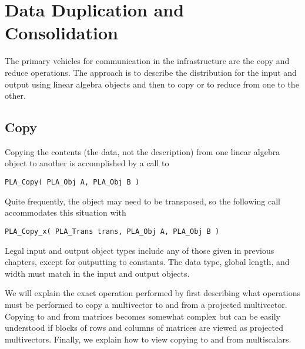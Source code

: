 \chapter{Data Duplication and Consolidation}
\label{chapter:data}

The primary vehicles for communication in the \plapack infrastructure are the
copy and reduce operations.  The approach is to describe the distribution for 
the input and output using linear algebra objects and then to copy or to reduce
from one to the other.


\section{Copy}

Copying the contents (the data, not the description) from one
linear algebra object to another is accomplished by a call to
\begin{FlaSpec}
\begin{verbatim}
PLA_Copy( PLA_Obj A, PLA_Obj B )
\end{verbatim}
\end{FlaSpec}

Quite frequently, the object may need to be transposed, so
the following call accommodates this situation with
\begin{FlaSpec}
\begin{verbatim}
PLA_Copy_x( PLA_Trans trans, PLA_Obj A, PLA_Obj B )
\end{verbatim}
\end{FlaSpec}
Legal input and output object types include any of those given 
in previous chapters, except for outputting to constants.  
The data type, global length, and width must match in the input 
and output objects.

We will explain the exact operation performed by first describing
what operations must be performed to copy a multivector to and from 
a projected multivector.  Copying to and from matrices becomes 
somewhat complex but can be easily understood if blocks of rows 
and columns of matrices are viewed as projected multivectors.
Finally, we explain how to view copying to and from multiscalars.


